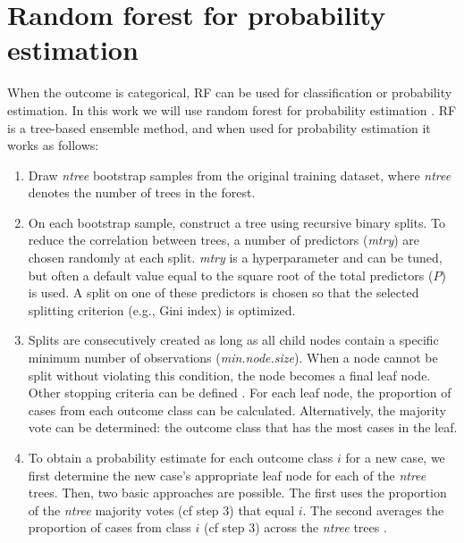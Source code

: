 \section{Random forest for probability estimation}
\label{sec:3.2}

When the outcome is categorical, \gls{RF} can be used for classification or
probability estimation. In this work we will use random forest for probability
estimation
 \cite{malleyProbabilityMachinesConsistent2012,dankowskiCalibratingRandomForests2016}.
\gls{RF} is a tree-based ensemble method, and when used for probability estimation it
works as follows:

\begin{enumerate}
\item Draw \textit{ntree} bootstrap samples from the original training dataset,
where \textit{ntree} denotes the number of trees in the forest.
\item On each bootstrap sample, construct a tree using recursive binary splits.
To reduce the correlation between trees, a number of predictors (\textit{mtry})
are chosen randomly at each split. \textit{mtry} is a hyperparameter and can be
tuned, but often a default value equal to the square root of the total
predictors ($P$) is used. A split on one of these predictors is chosen so that
the selected splitting criterion (e.g., Gini index) is optimized.
\item Splits are consecutively created as long as all child nodes contain a
specific minimum number of observations (\textit{min.node.size}). When a node
cannot be split without violating this condition, the node becomes a final leaf
node. Other stopping criteria can be defined
 \cite{probstHyperparametersTuningStrategies2019}. For each leaf node, the
proportion of cases from each outcome class can be calculated. Alternatively,
the majority vote can be determined: the outcome class that has the most cases
in the leaf.
\item To obtain a probability estimate for each outcome class $i$ for a new
case, we first determine the new case's appropriate leaf node for each of the
\textit{ntree} trees. Then, two basic approaches are possible. The first uses
the proportion of the \textit{ntree} majority votes (cf step 3) that equal $i$.
The second averages the proportion of cases from class $i$ (cf step 3) across
the \textit{ntree} trees
 \cite{malleyProbabilityMachinesConsistent2012}.
\end{enumerate}

